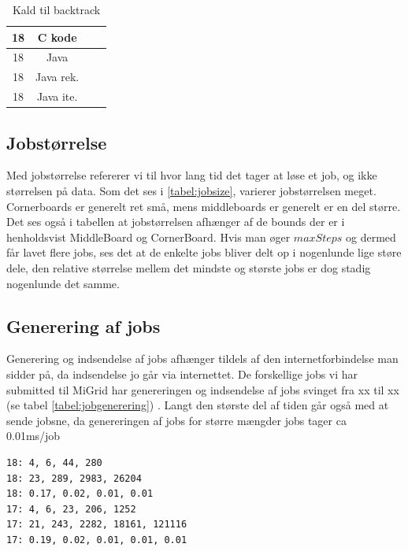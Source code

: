 \begin{table}
\begin{center}
\begin{tabular}{|c|c|c|c|}
\hline 18 & C kode        &             &             \\
\hline 18 & Java          &             &             \\
\hline 18 & Java rek. &             &             \\
\hline 18 & Java ite. &             &             \\
\hline
\end{tabular}
\caption{Kald til backtrack}
\label{table:backtrackkald}
\end{center}
\end{table}

\subsection{Jobstørrelse}

Med jobstørrelse refererer vi til hvor lang tid det tager at løse et job, og
ikke størrelsen på data. 
Som det ses i \ref{tabel:jobsize}, varierer jobstørrelsen
meget. Cornerboards er generelt ret små, mens middleboards er generelt er en del
større. Det ses også i tabellen at jobstørrelsen afhænger af de bounds der er i
henholdsvist MiddleBoard og CornerBoard. Hvis man øger $maxSteps$ og dermed får
lavet flere jobs, ses det at de enkelte jobs bliver delt op i nogenlunde lige
støre dele, den relative størrelse mellem det mindste og største jobs er dog
stadig nogenlunde det samme. 

\subsection{Generering af jobs}

Generering og indsendelse af jobs afhænger tildels af den internetforbindelse
man sidder på, da indsendelse jo går via internettet. De forskellige jobs vi har
submitted til MiGrid har genereringen og indsendelse af jobs svinget fra xx til
xx (se tabel \ref{tabel:jobgenerering}) . Langt den største del af tiden går også med at sende jobsne,
da genereringen af jobs for større mængder jobs tager ca 0.01ms/job
\begin{verbatim}
18: 4, 6, 44, 280
18: 23, 289, 2983, 26204
18: 0.17, 0.02, 0.01, 0.01
17: 4, 6, 23, 206, 1252
17: 21, 243, 2282, 18161, 121116
17: 0.19, 0.02, 0.01, 0.01, 0.01
\end{verbatim}

